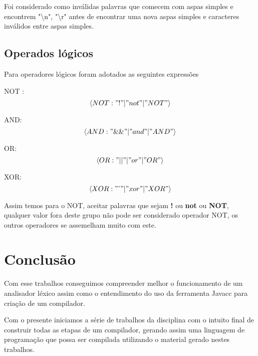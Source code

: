 \documentclass[
	article,			%
	11pt,				%
	oneside,			%
	a4paper,			%
	portuguese,			%
	brazil,				%
	sumario=tradicional
	]{abntex2}
\begin{document}
Foi considerado como inválidas palavras que comecem com aspas simples e encontrem "\textbackslash n", "\textbackslash r" antes de encontrar uma nova aspas simples e caracteres inválidos entre aspas simples.

\subsection{Operados lógicos}

Para operadores lógicos foram adotados as seguintes expressões

NOT : 
\[ \left< NOT : "!"  \vert  "not"  \vert  "NOT" \right> \]

AND:
\[ \left< AND : "\&\&"  \vert  "and"  \vert  "AND" \right> \]

OR:
\[ \left< OR : "\vert\vert"  \vert  "or"  \vert  "OR" \right> \]

XOR:
\[ \left< XOR : "  \hat{\ }  "  \vert  "xor"  \vert  "XOR" \right> \]

Assim temos para o NOT, aceitar palavras que sejam \textbf{!} ou \textbf{not} ou \textbf{NOT}, qualquer valor fora deste grupo não pode ser considerado operador NOT, os outros operadores se assemelham muito com este.

\section{Conclusão}

Com esse trabalhos conseguimos compreender melhor o funcionamento de um analisador léxico assim como o entendimento do uso da ferramenta Javacc para criação de um compilador.

Com o presente iniciamos a série de trabalhos da disciplina com o intuito final de construir todas as etapas de um compilador, gerando assim uma linguagem de programação que possa ser compilada utilizando o material gerado nestes trabalhos.


\end{document}

